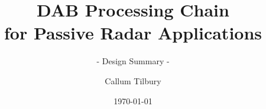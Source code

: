 \documentclass[10pt]{beamer}
\title{DAB Processing Chain\\for Passive Radar Applications}
\subtitle{- Design Summary -}
\author{Callum Tilbury}
\institute{Supervisor: Dr Stephen Paine\\University of Cape Town}
\date{\today}
\begin{document}
\frame{\titlepage}





\frame{}
\end{document}
